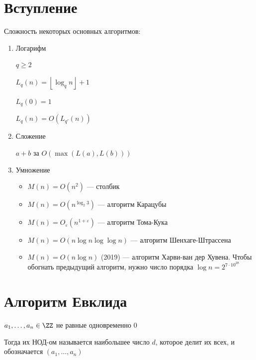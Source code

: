 \section{Вступление}

Сложность некоторых основных алгоритмов:
\begin{enumerate}
    \item
        Логарифм

        \( q \geq 2 \)

        \( L_q(n) = \left\lfloor \log_q n \right\rfloor + 1 \)

        \( L_q(0) = 1 \)

        \( L_q(n) = O(L_{q'}(n)) \)
    \item
        Сложение

        \( a + b \) за \( O(\max(L(a), L(b))) \)
    \item
        Умножение

        \begin{itemize}
            \item
                \( M(n) = O(n^2) \) --- столбик
            \item
                \( M(n) = O(n^{\log_2 3}) \) --- алгоритм Карацубы
            \item
                \( M(n) = O_{\varepsilon} (n^{1 + \varepsilon}) \) --- алгоритм Тома-Кука
            \item
                \( M(n) = O(n \log n \log \log n) \) --- алгоритм Шенхаге-Штрассена
            \item
                \( M(n) = O(n \log n) \) (2019) --- алгоритм Харви-ван дер Хувена.
                Чтобы обогнать предыдущий алгоритм, нужно число порядка \( \log n = 2^{7 \cdot 10^{38}} \)
        \end{itemize}
\end{enumerate}

\newpage

\section{Алгоритм Евклида}

\begin{defn}{}{}
    \( a_1, \ldots, a_n \in \ZZ \) не равные одновременно \( 0 \)

    Тогда их НОД-ом называется наибольшее число \( d \), которое делит их всех, и обозначается \( (a_1, \ldots, a_n) \)
\end{defn}

